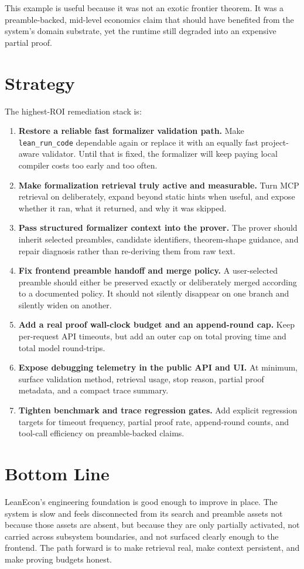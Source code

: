 \documentclass[11pt]{article}
\begin{document}
This example is useful because it was not an exotic frontier theorem. It was a
preamble-backed, mid-level economics claim that should have benefited from the
system's domain substrate, yet the runtime still degraded into an expensive
partial proof.

\section{Strategy}

The highest-ROI remediation stack is:

\begin{enumerate}[leftmargin=1.5em]
  \item \textbf{Restore a reliable fast formalizer validation path.} Make
  \texttt{lean\_run\_code} dependable again or replace it with an equally fast
  project-aware validator. Until that is fixed, the formalizer will keep paying
  local compiler costs too early and too often.
  \item \textbf{Make formalization retrieval truly active and measurable.}
  Turn MCP retrieval on deliberately, expand beyond static hints when useful,
  and expose whether it ran, what it returned, and why it was skipped.
  \item \textbf{Pass structured formalizer context into the prover.} The prover
  should inherit selected preambles, candidate identifiers, theorem-shape
  guidance, and repair diagnosis rather than re-deriving them from raw text.
  \item \textbf{Fix frontend preamble handoff and merge policy.} A user-selected
  preamble should either be preserved exactly or deliberately merged according
  to a documented policy. It should not silently disappear on one branch and
  silently widen on another.
  \item \textbf{Add a real proof wall-clock budget and an append-round cap.}
  Keep per-request API timeouts, but add an outer cap on total proving time and
  total model round-trips.
  \item \textbf{Expose debugging telemetry in the public API and UI.} At
  minimum, surface validation method, retrieval usage, stop reason, partial
  proof metadata, and a compact trace summary.
  \item \textbf{Tighten benchmark and trace regression gates.} Add explicit
  regression targets for timeout frequency, partial proof rate, append-round
  counts, and tool-call efficiency on preamble-backed claims.
\end{enumerate}

\section*{Bottom Line}

LeanEcon's engineering foundation is good enough to improve in place. The
system is slow and feels disconnected from its search and preamble assets not
because those assets are absent, but because they are only partially activated,
not carried across subsystem boundaries, and not surfaced clearly enough to the
frontend. The path forward is to make retrieval real, make context persistent,
and make proving budgets honest.
\end{document}
